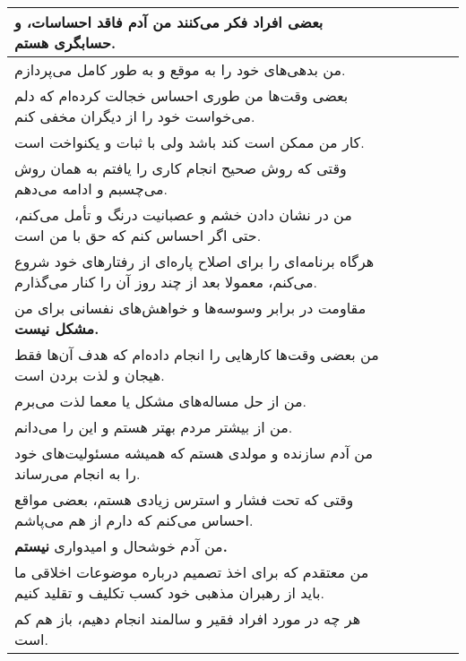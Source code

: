 \documentclass[a4paper,10pt]{article}
\begin{document}
\begin{center}
\begin{tabular}{|p{6cm}|c|c|c|c|c|}
بعضی افراد فکر می‌کنند من آدم فاقد احساسات، و حسابگری هستم.& & & & & \\
\hline

من بدهی‌های خود را به موقع و به طور کامل می‌پردازم.& & & & & \\
\hline

بعضی وقت‌ها من طوری احساس خجالت کرده‌ام که دلم می‌خواست خود را از دیگران مخفی کنم.& & & & & \\
\hline

کار من ممکن است کند باشد ولی با ثبات و یکنواخت است.& & & & & \\
\hline

وقتی که روش صحیح انجام کاری را یافتم به همان روش می‌چسبم و ادامه می‌دهم.& & & & & \\
\hline

من در نشان دادن خشم و عصبانیت درنگ و تأمل می‌کنم، حتی اگر احساس کنم که حق با من است.& & & & & \\
\hline

هرگاه برنامه‌ای را برای اصلاح پاره‌ای از رفتارهای خود شروع می‌کنم، معمولا بعد از چند روز آن را کنار می‌گذارم.& & & & & \\
\hline

مقاومت در برابر وسوسه‌ها و خواهش‌های نفسانی برای من \textbf{مشکل نیست.}& & & & & \\
\hline

من بعضی وقت‌ها کارهایی را انجام داده‌ام که هدف آن‌ها فقط هیجان و لذت بردن است.& & & & & \\
\hline

من از حل مساله‌های مشکل یا معما لذت می‌برم.& & & & & \\
\hline

من از بیشتر مردم بهتر هستم و این را می‌دانم.& & & & & \\
\hline

من آدم سازنده و مولدی هستم که همیشه مسئولیت‌های خود را به انجام می‌رساند.& & & & & \\
\hline

وقتی‌ که تحت فشار و استرس زیادی هستم، بعضی مواقع احساس می‌کنم که دارم از هم می‌پاشم.& & & & & \\
\hline

من آدم خوشحال و امیدواری \textbf{نیستم.}& & & & & \\
\hline

من معتقدم که برای اخذ تصمیم درباره موضوعات اخلاقی ما باید از رهبران مذهبی خود کسب تکلیف و تقلید کنیم.& & & & & \\
\hline

هر چه در مورد افراد فقیر و سالمند انجام دهیم، باز هم کم است.& & & & & \\
\hline

\end{tabular}
\end{center}
\end{document}
